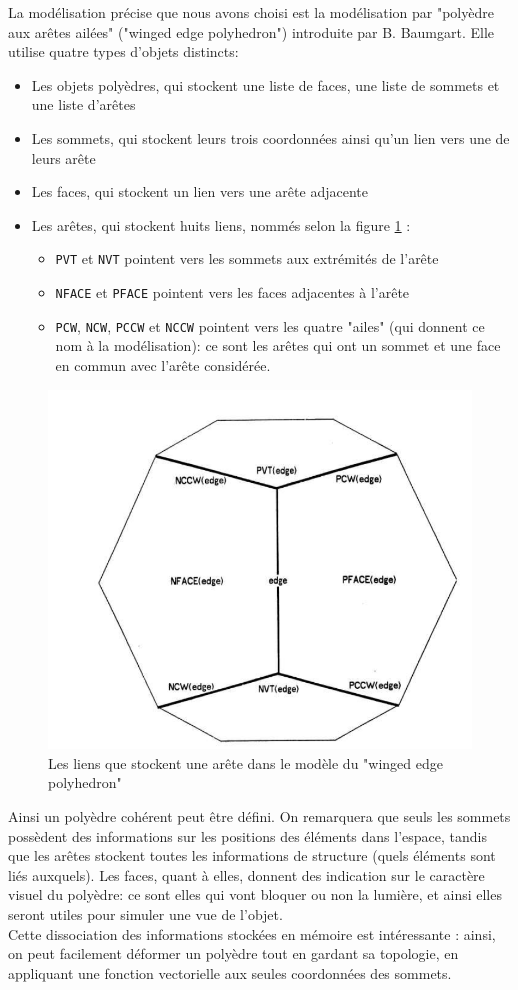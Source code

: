 \documentclass[a4paper]{article}
\begin{document}
      
      La modélisation précise que nous avons choisi est la modélisation par "polyèdre aux arêtes ailées" ("winged edge polyhedron") introduite par B. Baumgart. Elle utilise quatre types d'objets distincts:
      \begin{itemize}
        \item Les objets polyèdres, qui stockent une liste de faces, une liste de sommets et une liste d'arêtes
        \item Les sommets, qui stockent leurs trois coordonnées ainsi qu'un lien vers une de leurs arête
        \item Les faces, qui stockent un lien vers une arête adjacente
        \item Les arêtes, qui stockent huits liens, nommés selon la figure \ref{fig1} :
        \begin{itemize}
          \item \texttt{PVT} et \texttt{NVT} pointent vers les sommets aux extrémités de l'arête
          \item \texttt{NFACE} et \texttt{PFACE} pointent vers les faces adjacentes à l'arête
          \item \texttt{PCW}, \texttt{NCW}, \texttt{PCCW} et \texttt{NCCW} pointent vers les quatre "ailes" (qui donnent ce nom à la modélisation): ce sont les arêtes qui ont un sommet et une face en commun avec l'arête considérée.
        \end{itemize}
      \end{itemize}

      \begin{figure}
        \includegraphics[width=0.5\linewidth]{WEP}
        \centering
        \caption{Les liens que stockent une arête dans le modèle du "winged edge polyhedron"}
        \label{fig1}
      \end{figure}

      Ainsi un polyèdre cohérent peut être défini. On remarquera que seuls les sommets possèdent des informations sur les positions des éléments dans l'espace, tandis que les arêtes stockent toutes les informations de structure (quels éléments sont liés auxquels). Les faces, quant à elles, donnent des indication sur le caractère visuel du polyèdre: ce sont elles qui vont bloquer ou non la lumière, et ainsi elles seront utiles pour simuler une vue de l'objet.\\
      Cette dissociation des informations stockées en mémoire est intéressante : ainsi, on peut facilement déformer un polyèdre tout en gardant sa topologie, en appliquant une fonction vectorielle aux seules coordonnées des sommets.\\
      \\
\end{document}
